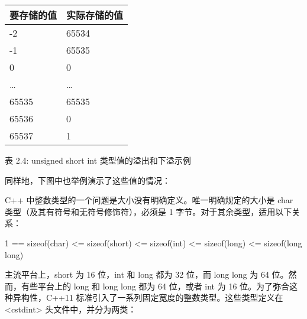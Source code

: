 \begin{longtable}{|l|l|}
\hline
\textbf{要存储的值} & \textbf{实际存储的值} \\ \hline
\endfirsthead
%
\endhead
%
-2                      & 65534                 \\ \hline
-1                      & 65535                 \\ \hline
0                       & 0                     \\ \hline
…                       & …                     \\ \hline
65535                   & 65535                 \\ \hline
65536                   & 0                     \\ \hline
65537                   & 1                     \\ \hline
\end{longtable}

\begin{center}
表 2.4: unsigned short int 类型值的溢出和下溢示例
\end{center}

同样地，下图中也举例演示了这些值的情况：


C++ 中整数类型的一个问题是大小没有明确定义。唯一明确规定的大小是 char 类型（及其有符号和无符号修饰符），必须是 1 字节。对于其余类型，适用以下关系：

\begin{cpp}
1 == sizeof(char) <= sizeof(short) <= sizeof(int) <= sizeof(long) <= sizeof(long long)
\end{cpp}

主流平台上，short 为 16 位，int 和 long 都为 32 位，而 long long 为 64 位。然而，有些平台上的 long 和 long long 都为 64 位，或者 int 为 16 位。为了弥合这种异构性，C++11 标准引入了一系列固定宽度的整数类型。这些类型定义在 <cstdint> 头文件中，并分为两类：

